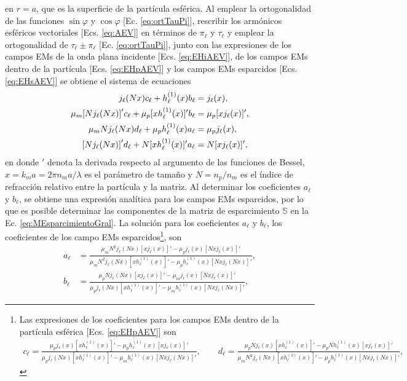 \noindent
en $r =a$, que es la superficie de la partícula esférica. Al emplear la ortogonalidad de las funciones $\sin\varphi$ y $\cos\varphi$ [Ec. \eqref{eq:ortTauPi}], rescribir los armónicos esféricos vectoriales [Ecs. \eqref{eq:AEV}] en términos de $\pi_\ell$ y $\tau_\ell$ y emplear la ortogonalidad de $\tau_\ell\pm\pi_\ell$ [Ec. \eqref{eq:ortTauPi}], junto con las expresiones de los campos EMs de la onda plana incidente [Ecs. \eqref{eq:EHiAEV}], de los campos EMs dentro de la partícula [Ecs. \eqref{eq:EHpAEV}] y los campos EMs esparcidos [Ecs. \eqref{eq:EHsAEV}] se obtiene el sistema de ecuaciones
	\begin{align*}
	j_\ell(Nx)c_\ell + h_\ell^{(1)}(x)b_\ell &= j_\ell(x),\\
	\mu_m\qty[Nj_\ell(Nx)]'c_\ell + \mu_p [xh_\ell^{(1)}(x)]'b_\ell &= \mu_p [xj_\ell(x)]',\\
	\mu_m N j_\ell(Nx)d_\ell +\mu_p h_\ell^{(1)}(x)a_\ell &=\mu_p j_\ell(x),\\
	\qty[Nj_\ell(Nx)]'d_\ell + N [xh_\ell^{(1)}(x)]'a_\ell &= N [xj_\ell(x)]',
	\end{align*}
en donde $'$ denota la derivada respecto al argumento de las funciones de Bessel, $x = k_m a = 2 \pi n_m a /\lambda$ es el parámetro de tamaño y $N = n_p / n_m$ es el índice de refracción relativo entre la partícula y la matriz. Al determinar los coeficientes $a_\ell$ y $b_\ell$, se obtiene una expresión analítica para los campos EMs esparcidos, por lo que es posible determinar las componentes de la matriz de esparcimiento $\mathbb{S}$ en la Ec. \eqref{eq:MEsparcimientoGral}. La solución para los coeficientes $a_\ell$ y $b_\ell$, los coeficientes de los campo EMs esparcidos\footnote{Las expresiones de los coeficientes para los campos EMs dentro de la partícula esférica [Ecs. \eqref{eq:EHpAEV}] son
	\begin{align*}
	c_\ell = \frac{\mu_p j_\ell(x)[xh_\ell^{(1)}(x)]' - \mu_p h_\ell^{(1)}(x) [xj_\ell(x)]'}
				{\mu_pj_\ell(Nx) [xh_\ell^{(1)}(x)]'-\mu_m h_\ell^{(1)}(x) [N x j_\ell(Nx)]' },
	\qquad	
	d_\ell = \frac{\mu_p N j_\ell(x)[xh_\ell^{(1)}(x)]' - \mu_p N h_\ell^{(1)}(x) [xj_\ell(x)]'}
				{\mu_m N^2 j_\ell(Nx) [xh_\ell^{(1)}(x)]'-\mu_p h_\ell^{(1)}(x) [N x j_\ell(Nx)]' }	,
	\end{align*}}, son
	\begin{subequations}\begin{align}
	a_\ell &= \frac{\mu_m N^2 j_\ell(Nx)[xj_\ell(x)]' - \mu_p j_\ell(x) [Nxj_\ell(x)]'}
				{\mu_mN^2j_\ell(Nx) [xh_\ell^{(1)}(x)]'-\mu_p h_\ell^{(1)}(x) [N x j_\ell(Nx)]' },
	\label{eq:a_ellFULL}\\
	b_\ell &= \frac{\mu_p N j_\ell(Nx)[xj_\ell(x)]' - \mu_m j_\ell(x) [Nxj_\ell(x)]'}
				{\mu_p j_\ell(Nx) [xh_\ell^{(1)}(x)]'-\mu_m h_\ell^{(1)}(x) [N x j_\ell(Nx)]' },
	\label{eq:b_ellFULL}			
	\end{align}\label{eq:MieCoefScattFULL}\end{subequations}
